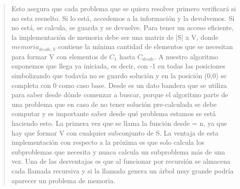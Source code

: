 \documentclass[7pt,a4paper]{article}
\begin{document}
\begin{verse}
Esto asegura que cada problema que se quiera resolver primero verificará si no esta resuelto. Si lo está, accedemos a la información y la devolvemos. Si no está, se calcula, se guarda y se devuelve. Para tener un acceso eficiente, la implementación de memoria debe ser una matriz de |S| x V, donde $memoria_{desde,V}$ contiene la mínima cantidad de elementos que se necesitan para formar V con elementos de $C_{1}$ hasta $C_{desde}$. A nuestro algoritmo suponemos que llega ya iniciada, es decir, con -1 en todas las posiciones simbolizando que todavía no se guardo solución y en la posición (0,0) se completa con 0 como caso base. Desde es un dato bandera que se utiliza para saber desde dónde comenzar a buscar, porque el algoritmo parte de una problema que en caso de no tener solución pre-calculada se debe computar y es importante saber desde qué problema estamos se está haciendo esto. La primera vez que se llama la función desde = n, ya que hay que formar V con cualquier subconjunto de S. La ventaja de esta implementación con respecto a la próxima es que solo calcula los subproblemas que necesita y nunca calcula un subproblema más de una vez. Una de las desventajas es que al funcionar por recursión se almacena cada llamada recursiva y si la llamada genera un árbol muy grande podría aparecer un problema de memoria.\\
\end{verse}
\end{document}

